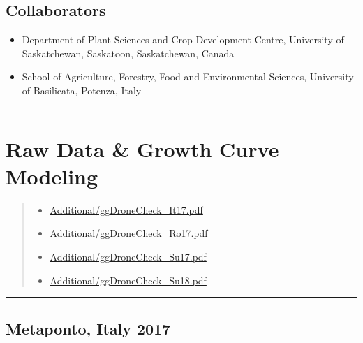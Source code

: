 \documentclass[
]{article}
\providecommand{\tightlist}{%
  \setlength{\itemsep}{0pt}\setlength{\parskip}{0pt}}
\begin{document}
\subsection{Collaborators}\label{collaborators}

\begin{itemize}
\tightlist
\item
  Department of Plant Sciences and Crop Development Centre, University
  of Saskatchewan, Saskatoon, Saskatchewan, Canada
\item
  School of Agriculture, Forestry, Food and Environmental Sciences,
  University of Basilicata, Potenza, Italy
\end{itemize}

\begin{center}\rule{0.5\linewidth}{0.5pt}\end{center}

\section{Raw Data \& Growth Curve
Modeling}\label{raw-data-growth-curve-modeling}

\begin{quote}
\begin{itemize}
\tightlist
\item
  \href{https://github.com/derekmichaelwright/AGILE_LDP_UAV/Additional/ggDroneCheck_It17.pdf}{Additional/ggDroneCheck\_It17.pdf}
\item
  \href{https://github.com/derekmichaelwright/AGILE_LDP_UAV/Additional/ggDroneCheck_Ro17.pdf}{Additional/ggDroneCheck\_Ro17.pdf}
\item
  \href{https://github.com/derekmichaelwright/AGILE_LDP_UAV/Additional/ggDroneCheck_Su17.pdf}{Additional/ggDroneCheck\_Su17.pdf}
\item
  \href{https://github.com/derekmichaelwright/AGILE_LDP_UAV/Additional/ggDroneCheck_Su18.pdf}{Additional/ggDroneCheck\_Su18.pdf}
\end{itemize}
\end{quote}

\begin{center}\rule{0.5\linewidth}{0.5pt}\end{center}

\subsection{Metaponto, Italy 2017}\label{metaponto-italy-2017}
\end{document}
